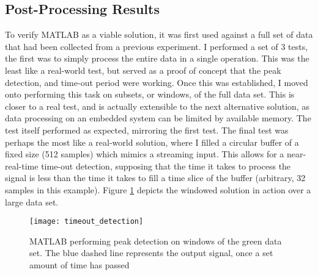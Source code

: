 \subsection{Post-Processing Results}
	To verify MATLAB as a viable solution, it was first used against a full set of data that had been collected from a previous experiment. I performed a set of 3 tests, the first was to simply process the entire data in a single operation. This was the least like a real-world test, but served as a proof of concept that the peak detection, and time-out period were working. Once this was established, I moved onto performing this task on subsets, or windows, of the full data set. This is closer to a real test, and is actually extensible to the next alternative solution, as data processing on an embedded system can be limited by available memory. The test itself performed as expected, mirroring the first test. The final test was perhaps the most like a real-world solution, where I filled a circular buffer of a fixed size (512 samples) which mimics a streaming input. This allows for a near-real-time time-out detection, supposing that the time it takes to process the signal is less than the time it takes to fill a time slice of the buffer (arbitrary, 32 samples in this example). Figure \ref{fig::timeout_detection} depicts the windowed solution in action over a large data set.
	
	\begin{figure}[htbp!]
		\centering
		\texttt{[image: timeout\_detection]}
		\caption[MATLAB windowed peak detection on generated data]{MATLAB performing peak detection on windows of the green data set. The blue dashed line represents the output signal, once a set amount of time has passed}
		\label{fig::timeout_detection}
	\end{figure}
